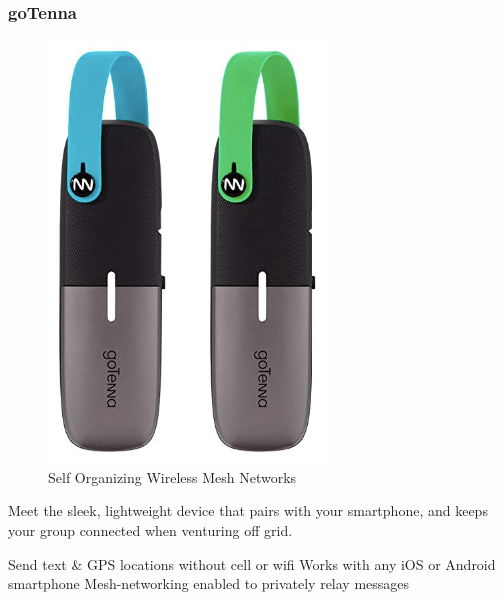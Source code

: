 		
			\subsubsection{goTenna}
				
				\noindent
				\begin{minipage}{0.48\textwidth}%
					\begin{figure}[H]
						\centering
						\includegraphics[width=\textwidth]{resources/img/chap4/gotenna}
						\caption[Self Organizing Wireless Mesh Networks]{Self Organizing Wireless Mesh Networks\cite{BADIS2015653}}
						\label{img:wms_microsoft}
					\end{figure}
				\end{minipage}%
				\hfill%
				\begin{minipage}{0.5\textwidth}\raggedright
				 Meet the sleek, lightweight device that pairs with your smartphone, and keeps your group connected when venturing off grid.
				
				Send text \& GPS locations without cell or wifi
				Works with any iOS or Android smartphone
				Mesh-networking enabled to privately relay messages
				\end{minipage}
			
